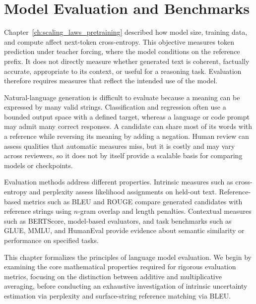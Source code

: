 \documentclass[../../../main.tex]{subfiles}
\begin{document}
\chapter{Model Evaluation and Benchmarks}
\label{ch:evaluation_metrics_benchmarks}

Chapter~\ref{ch:scaling_laws_pretraining} described how model size, training data, and compute affect next-token cross-entropy. This objective measures token prediction under teacher forcing, where the model conditions on the reference prefix. It does not directly measure whether generated text is coherent, factually accurate, appropriate to its context, or useful for a reasoning task. Evaluation therefore requires measures that reflect the intended use of the model.

Natural-language generation is difficult to evaluate because a meaning can be expressed by many valid strings. Classification and regression often use a bounded output space with a defined target, whereas a language or code prompt may admit many correct responses. A candidate can share most of its words with a reference while reversing its meaning by adding a negation. Human review can assess qualities that automatic measures miss, but it is costly and may vary across reviewers, so it does not by itself provide a scalable basis for comparing models or checkpoints.

Evaluation methods address different properties. Intrinsic measures such as cross-entropy and perplexity assess likelihood assignments on held-out text. Reference-based metrics such as BLEU and ROUGE compare generated candidates with reference strings using $n$-gram overlap and length penalties. Contextual measures such as BERTScore, model-based evaluators, and task benchmarks such as GLUE, MMLU, and HumanEval provide evidence about semantic similarity or performance on specified tasks.

This chapter formalizes the principles of language model evaluation. We begin by examining the core mathematical properties required for rigorous evaluation metrics, focusing on the distinction between additive and multiplicative averaging, before conducting an exhaustive investigation of intrinsic uncertainty estimation via perplexity and surface-string reference matching via BLEU.

\clearpage
\end{document}
